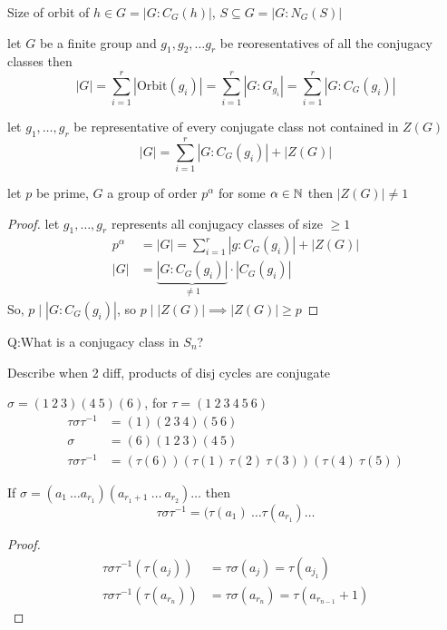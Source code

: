 Size of orbit of $h \in G = |G:C_G(h)|$, $S \subseteq G = |G:N_G(S)|$

\begin{theorem}
  let $G$ be a finite group and $g_1, g_2, \dotsc g_r$ be reoresentatives of all the conjugacy classes
  then \[|G| = \sum_{i = 1}^r |\text{Orbit}(g_i)| = \sum_{i=1}^r|G:G_{g_i}| = \sum_{i=1}^r|G:C_G(g_i)|\]
\end{theorem}

let $g_1, \dotsc, g_r$ be representative of every conjugate class not contained in $Z(G)$
\[|G| = \sum_{i=1}^r|G:C_G(g_i)| + |Z(G)|\]

\begin{theorem}
  let $p$ be prime, $G$ a group of order $p^\alpha$ for some $\alpha \in \mathbb N$ then 
  $|Z(G)| \neq 1$
\end{theorem}
\begin{proof}
  let $g_1, \dotsc, g_r$ represents all conjugacy classes of size $\ge 1$
  \begin{align*}
    p^\alpha &= |G| = \sum_{i=1}^r |g:C_G(g_i)| + |Z(G)| \\
    |G| &= \underbrace{|G:C_G(g_i)|}_{\neq 1} \cdot |C_G(g_i)|
  \end{align*}
  So, $p \mid |G:C_G(g_i)|$, so $p \mid |Z(G)| \implies |Z(G)| \ge p$
\end{proof}


\begin{example}
  
Q:What is a conjugacy class in $S_n$?

Describe when 2 diff, products of disj cycles are conjugate

$\sigma = (1\ 2\ 3)(4\ 5)(6)$, for $\tau = (1\ 2\ 3\ 4\ 5\ 6)$
\begin{align*}
  \tau\sigma\tau^{-1} &= (1)(2\ 3\ 4)(5\ 6) \\
  \sigma &= (6)(1\ 2\ 3)(4\ 5) \\
  \tau\sigma\tau^{-1} &= (\tau(6))(\tau(1)\ \tau(2)\ \tau(3))(\tau(4)\ \tau(5)) 
\end{align*}
\end{example}

\begin{observation}
  If $\sigma = (a_1\ \dotsc a_{r_1})(a_{r_1+1}\ \dotsc\ a_{r_2})\dotsc$
  then 
  \[\tau\sigma\tau^{-1} = (\tau(a_1)\ \dotsc \tau(a_{r_1}) \dotsc\]
\end{observation}
\begin{proof}
  \begin{align*}
    \tau\sigma\tau^{-1}(\tau(a_j)) &= \tau\sigma(a_j) = \tau(a_{j_1}) \\
    \tau\sigma\tau^{-1}(\tau(a_{r_n})) &= \tau\sigma(a_{r_n}) = \tau(a_{r_{n-1}} + 1)
  \end{align*}
\end{proof}

